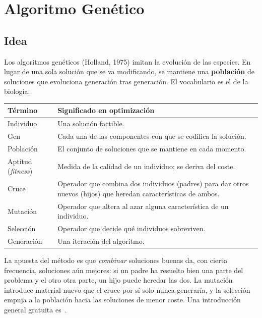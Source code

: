 \section{Algoritmo Genético}\label{sec:genetico}

\subsection{Idea}

Los algoritmos genéticos (Holland, 1975) imitan la evolución de las especies. En lugar de una
sola solución que se va modificando, se mantiene una \textbf{población} de soluciones que
evoluciona generación tras generación. El vocabulario es el de la biología:

\begin{center}
\begin{tabular}{@{}lp{11cm}@{}}
\toprule
Término & Significado en optimización \\ \midrule
Individuo & Una solución factible. \\
Gen & Cada una de las componentes con que se codifica la solución. \\
Población & El conjunto de soluciones que se mantiene en cada momento. \\
Aptitud (\emph{fitness}) & Medida de la calidad de un individuo; se deriva del coste. \\
Cruce & Operador que combina dos individuos (padres) para dar otros nuevos (hijos) que
        heredan características de ambos. \\
Mutación & Operador que altera al azar alguna característica de un individuo. \\
Selección & Operador que decide qué individuos sobreviven. \\
Generación & Una iteración del algoritmo. \\
\bottomrule
\end{tabular}
\end{center}

La apuesta del método es que \emph{combinar} soluciones buenas da, con cierta frecuencia,
soluciones aún mejores: si un padre ha resuelto bien una parte del problema y el otro otra
parte, un hijo puede heredar las dos. La mutación introduce material nuevo que el cruce por
sí solo nunca generaría, y la selección empuja a la población hacia las soluciones de menor
coste. Una introducción general gratuita es~\cite[cap.~3]{luke}.

